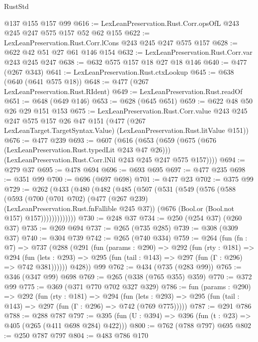 \begin{lexlean}{RustStd}
\begin{coremodule}
{\begin{coremodule}
{{{{{{    @137
    @155
    @157
    @99
@616 := LexLeanPreservation.Rust.Corr.opsOfL @243 @245 @247 @575 @157 @52 @62 @155
@622 := LexLeanPreservation.Rust.Corr.lCons @243 @245 @247 @575 @157
@628 := @622 @42 @51 @27 @61 @146 @154
@632 := LexLeanPreservation.Rust.Corr.var @243 @245 @247
@638 := @632 @575 @157 @18 @27 @18 @146
@640 := @477 (@267 @343)
@641 := LexLeanPreservation.Rust.ctxLookup
@645 := @638 (@640 (@641 @575 @18))
@648 := @477 (@267 LexLeanPreservation.Rust.RIdent)
@649 := LexLeanPreservation.Rust.readOf
@651 := @648 (@649 @146)
@653 := @628 (@645 @651)
@659 := @622 @48 @50 @26 @29 @151 @153
@675 := LexLeanPreservation.Rust.Corr.value
    @243
    @245
    @247
    @575
    @157
    @26
    @47
    @151
    (@477 (@267 LexLeanTarget.TargetSyntax.Value) (LexLeanPreservation.Rust.litValue @151))
@676 := @477 @239
@693 := @607
    (@616
      (@653
        (@659
          (@675 (@676 (LexLeanPreservation.Rust.typedLit @243 @47 @26)))
          (LexLeanPreservation.Rust.Corr.lNil @243 @245 @247 @575 @157))))
@694 := @279 @37
@695 := @478 @694
@696 := @693 @695
@697 := @477 @235
@698 := @351 @99
@700 := @696 (@697 @698)
@701 := @477 @23
@702 := @375 @99
@729 := @262
    (@433
      (@480
        (@482
          (@485
            (@507
              (@531
                (@549
                  (@576
                    (@588
                      (@593
                        (@700
                          (@701 @702)
                          (@477 (@267 @239) (LexLeanPreservation.Rust.fnFallible @245 @37))
                          (@676 (Bool.or (Bool.not @157) @157)))))))))))))
@730 := @248 @37
@734 := @250 (@254 @37) (@260 @37)
@735 := @269 @694
@737 := @265 (@735 @285)
@739 := @308 (@309 @37)
@740 := @304 @739
@742 := @265 (@740 @334)
@759 := @264
    (fun (fn : @7) =>
    @737
      (@288
        (@291
          (fun (params : @290) =>
          @292
            (fun (rty : @181) =>
            @294
              (fun (lets : @293) =>
              @295 (fun (tail : @143) => @297 (fun (Γ : @296) => @742 @381))))))
        @428))
    @99
@762 := @434 (@735 (@283 @99))
@765 := @346 (@347 @99) @698
@769 := @265 (@338 (@765 @355) @359)
@770 := @372 @99
@775 := @369 (@371 @770 @702 @327 @329)
@786 := fun (params : @290) =>
  @292
    (fun (rty : @181) =>
    @294
      (fun (lets : @293) => @295 (fun (tail : @143) => @297 (fun (Γ : @296) => @742 (@769 @775)))))
@787 := @291 @786
@788 := @288 @787
@797 := @395 (fun (U : @394) => @396 (fun (t : @23) => @405 (@265 (@411 @698 @284) @422)))
@800 := @762 (@788 @797) @695
@802 := @250 @787 @797
@804 := @483 @786 @170
}}}}}}
\end{coremodule}}
\end{coremodule}
\end{lexlean}
